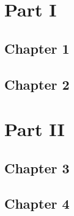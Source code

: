 \documentclass[familytree]{bringhurst}
\begin{document}
\frontmatter





\tableofcontents*
\thispagestyle{empty}



\mainmatter

\part{Part I}
\chapter{Chapter 1}
    
\chapter{Chapter 2}
    

\part{Part II}
\chapter{Chapter 3}
    
\chapter{Chapter 4}
    
\end{document}
